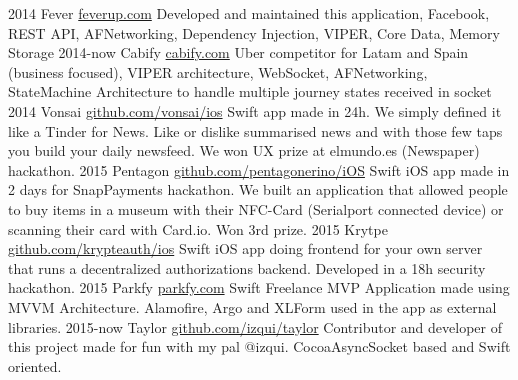 \documentclass[]{perezpaya-cv}
\begin{document}
\begin{entrylist}
  \entry
    {2014}
    {Fever}
    {\href{http://feverup.com}{feverup.com}}
    {Developed and maintained this application, Facebook, REST API, AFNetworking, Dependency Injection, VIPER, Core Data, Memory Storage}
  \entry
    {2014-now}
    {Cabify}
    {\href{http://cabify.com}{cabify.com}}
    {Uber competitor for Latam and Spain (business focused), VIPER architecture, WebSocket, AFNetworking, StateMachine Architecture to handle multiple journey states received in socket }
  \entry
    {2014}
    {Vonsai}
    {\href{https://github.com/vonsai/ios}{github.com/vonsai/ios}}
    {Swift app made in 24h. We simply defined it like a Tinder for News. Like or dislike summarised news and with those few taps you build your daily newsfeed. We won UX prize at elmundo.es (Newspaper) hackathon.}
  \entry
    {2015}
    {Pentagon}
    {\href{https://github.com/pentagonerino/iOS}{github.com/pentagonerino/iOS}}
    {Swift iOS app made in 2 days for SnapPayments hackathon. We built an application that allowed people to buy items in a museum with their NFC-Card (Serialport connected device) or scanning their card with Card.io. Won 3rd prize.}
  \entry
    {2015}
    {Krytpe}
    {\href{https://github.com/krypteauth/ios}{github.com/krypteauth/ios}}
    {Swift iOS app doing frontend for your own server that runs a decentralized authorizations backend. Developed in a 18h security hackathon.}
  \entry
    {2015}
    {Parkfy}
    {\href{https://parkfy.com}{parkfy.com}}
    {Swift Freelance MVP Application made using MVVM Architecture. Alamofire, Argo and XLForm used in the app as external libraries.}
  \entry
    {2015-now}
    {Taylor}
    {\href{http://github.com/izqui/Taylor}{github.com/izqui/taylor}}
    {Contributor and developer of this project made for fun with my pal @izqui. CocoaAsyncSocket based and Swift oriented.}
\end{entrylist}
\end{document}
